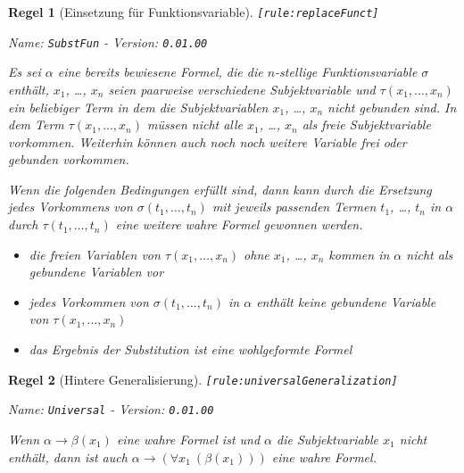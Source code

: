 \documentclass[a4paper,german,10pt,twoside]{book}
\newtheorem{rul}{Regel}
\theoremstyle{definition}
\theoremstyle{remark}
\begin{document}
\begin{rul}[Einsetzung f{\"u}r Funktionsvariable]
\label{rule:replaceFunct} \hypertarget{rule:replaceFunct}{}
{\tt \tiny [\verb]rule:replaceFunct]]}

\par
{\em   Name: \verb]SubstFun]  -  Version: \verb]0.01.00]}


Es sei $\alpha$ eine bereits bewiesene Formel, die die $n$-stellige Funktionsvariable $\sigma$ enth{\"a}lt, $x_1$, \ldots, $x_n$ seien paarweise verschiedene Subjektvariable und $\tau(x_1, \ldots, x_n)$ ein beliebiger Term in dem die Subjektvariablen $x_1$, \ldots, $x_n$ nicht gebunden sind. In dem Term $\tau(x_1, \ldots, x_n)$ m{\"u}ssen nicht alle $x_1$, \ldots, $x_n$ als freie Subjektvariable vorkommen. Weiterhin k{\"o}nnen auch noch  noch weitere Variable frei oder gebunden vorkommen.

Wenn die folgenden Bedingungen erf{\"u}llt sind, dann kann durch die Ersetzung jedes Vorkommens von $\sigma(t_1, \ldots, t_n)$ mit jeweils passenden Termen $t_1$, \ldots, $t_n$ in $\alpha$ durch $\tau(t_1, \ldots, t_n)$ eine weitere wahre Formel gewonnen 
werden.

\begin{itemize}

\item
die freien Variablen von $\tau(x_1, \ldots, x_n)$ ohne $x_1$, \ldots, $x_n$ kommen in $\alpha$ nicht als gebundene Variablen vor

\item
jedes Vorkommen von $\sigma(t_1, \ldots, t_n)$ in $\alpha$ enth{\"a}lt keine gebundene Variable von $\tau(x_1, \ldots, x_n)$

\item
das Ergebnis der Substitution ist eine wohlgeformte Formel

\end{itemize}
\end{rul}


\begin{rul}[Hintere Generalisierung]
\label{rule:universalGeneralization} \hypertarget{rule:universalGeneralization}{}
{\tt \tiny [\verb]rule:universalGeneralization]]}

\par
{\em   Name: \verb]Universal]  -  Version: \verb]0.01.00]}


Wenn $\alpha \rightarrow \beta(x_1)$ eine wahre Formel ist und $\alpha$ die Subjektvariable $x_1$ nicht enth{\"a}lt, dann ist auch $\alpha \rightarrow (\forall x_1~(\beta(x_1)))$ 
eine wahre Formel.
\end{rul}
\end{document}
